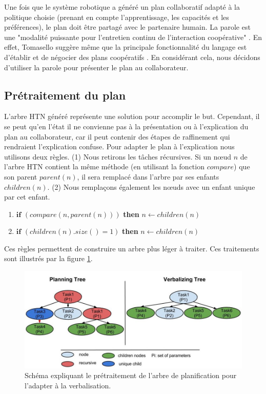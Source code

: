 \documentclass[a4paper,11pt,twoside]{StyleThese}
\begin{document}
Une fois que le système robotique a généré un plan collaboratif adapté à la politique choisie (prenant en compte l'apprentissage, les capacités et les préférences), le plan doit être partagé avec le partenaire humain.
La parole est une "modalité puissante pour l'entretien continu de l'interaction coopérative" \cite{Lallee2013}. En effet, Tomasello suggère même que la principale fonctionnalité du langage est d'établir et de négocier des plans coopératifs \cite{tomasello2005}.
En considérant cela, nous décidons d'utiliser la parole pour présenter le plan au collaborateur.

\subsection{Prétraitement du plan}
L'arbre HTN généré représente une solution pour accomplir le but. Cependant, il se peut qu'en l'état il ne convienne pas à la présentation ou à l'explication du plan au collaborateur, car il peut contenir des étapes de raffinement qui rendraient l'explication confuse. Pour adapter le plan à l'explication nous utilisons deux règles.
%
(1) Nous retirons les tâches récursives. Si un nœud $n$ de l'arbre HTN contient la même méthode (en utilisant la fonction $compare$) que son parent $parent(n)$, il sera remplacé dans l'arbre par ses enfants $children(n)$. (2) Nous remplaçons également les nœuds avec un enfant unique par cet enfant.
\begin{enumerate}
\item $\textbf{if}$ $(compare(n, parent(n)))$ \textbf{then} $n \leftarrow children(n)$
\item $\textbf{if}$ $(children(n).size() = 1)$ \textbf{then} $n \leftarrow children(n)$
\end{enumerate}
Ces règles permettent de construire un arbre plus léger à traiter.
Ces traitements sont illustrés par la figure \ref{fig:pretraitement}.

\begin{figure}[ht!]
 \centering
  \includegraphics[width=0.99 \textwidth]{img/rules2.jpg}
 \caption{Schéma expliquant le prétraitement de l'arbre de planification pour l'adapter à la verbalisation.}
 \label{fig:pretraitement}
 \end{figure}
\end{document}

